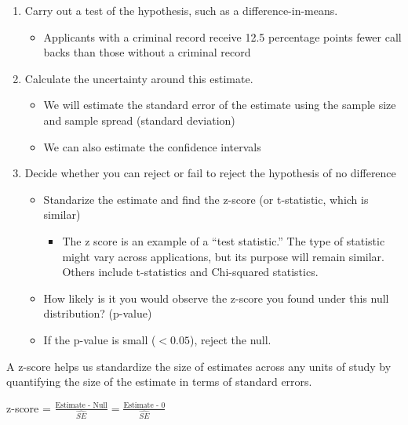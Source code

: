 \documentclass[
  letterpaper,
  DIV=11,
  numbers=noendperiod]{scrreprt}
\providecommand{\tightlist}{%
  \setlength{\itemsep}{0pt}\setlength{\parskip}{0pt}}\usepackage{longtable,booktabs,array}
\begin{document}
\begin{enumerate}
\def\labelenumi{\arabic{enumi}.}
\setcounter{enumi}{3}
\tightlist
\item
  Carry out a test of the hypothesis, such as a difference-in-means.

  \begin{itemize}
  \tightlist
  \item
    Applicants with a criminal record receive 12.5 percentage points
    fewer call backs than those without a criminal record
  \end{itemize}
\item
  Calculate the uncertainty around this estimate.

  \begin{itemize}
  \tightlist
  \item
    We will estimate the standard error of the estimate using the sample
    size and sample spread (standard deviation)
  \item
    We can also estimate the confidence intervals
  \end{itemize}
\item
  Decide whether you can reject or fail to reject the hypothesis of no
  difference

  \begin{itemize}
  \tightlist
  \item
    Standarize the estimate and find the z-score (or t-statistic, which
    is similar)

    \begin{itemize}
    \tightlist
    \item
      The z score is an example of a ``test statistic.'' The type of
      statistic might vary across applications, but its purpose will
      remain similar. Others include t-statistics and Chi-squared
      statistics.
    \end{itemize}
  \item
    How likely is it you would observe the z-score you found under this
    null distribution? (p-value)
  \item
    If the p-value is small (\(< 0.05\)), reject the null.
  \end{itemize}
\end{enumerate}

A z-score helps us standardize the size of estimates across any units of
study by quantifying the size of the estimate in terms of standard
errors.

z-score =
\(\frac{\text{Estimate - Null}}{\hat{SE}} = \frac{\text{Estimate - 0}}{\hat{SE}}\)
\end{document}
